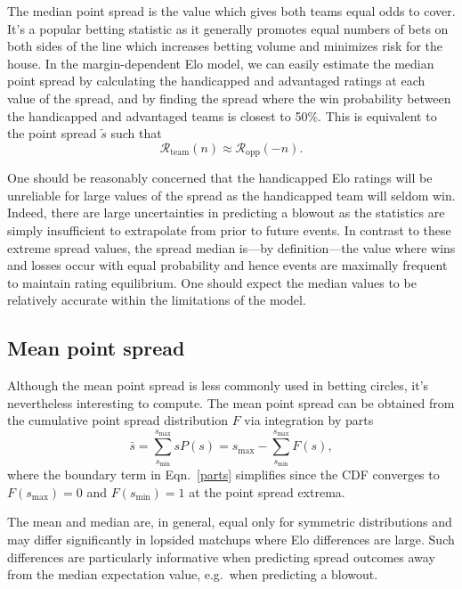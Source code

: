 \documentclass[aps,prc,reprint,amsmath,superscriptaddress]{revtex4-1}
\newcommand{\R}{\mathcal{R}}
\begin{document}
The median point spread is the value which gives both teams equal odds to cover.
It's a popular betting statistic as it generally promotes equal numbers of bets on both sides of the line which increases betting volume and minimizes risk for the house.
In the margin-dependent Elo model, we can easily estimate the median point spread by calculating the handicapped and advantaged ratings at each value of the spread, and by finding the spread where the win probability between the handicapped and advantaged teams is closest to 50\%.
This is equivalent to the point spread $\tilde{s}$ such that
\begin{equation}
  \R_\text{team}(n) \approx \R_\text{opp}(-n).
\end{equation}

One should be reasonably concerned that the handicapped Elo ratings will be unreliable for large values of the spread as the handicapped team will seldom win.
Indeed, there are large uncertainties in predicting a blowout as the statistics are simply insufficient to extrapolate from prior to future events.
In contrast to these extreme spread values, the spread median is---by definition---the value where wins and losses occur with equal probability and hence events are maximally frequent to maintain rating equilibrium.
One should expect the median values to be relatively accurate within the limitations of the model.

\subsection{Mean point spread}

Although the mean point spread is less commonly used in betting circles, it's nevertheless interesting to compute.
The mean point spread can be obtained from the cumulative point spread distribution $F$ via integration by parts
\begin{equation}
  \label{parts}
  \bar{s} = \sum\limits_{s_\text{min}}^{s_\text{max}} s P(s) = s_\text{max} - \sum\limits_{s_\text{min}}^{s_\text{max}} F(s),
\end{equation}
where the boundary term in Eqn.~\eqref{parts} simplifies since the CDF converges to $F(s_\text{max})=0$ and $F(s_\text{min})=1$ at the point spread extrema.

The mean and median are, in general, equal only for symmetric distributions and may differ significantly in lopsided matchups where Elo differences are large.
Such differences are particularly informative when predicting spread outcomes away from the median expectation value, e.g.\ when predicting a blowout. 
\end{document}
